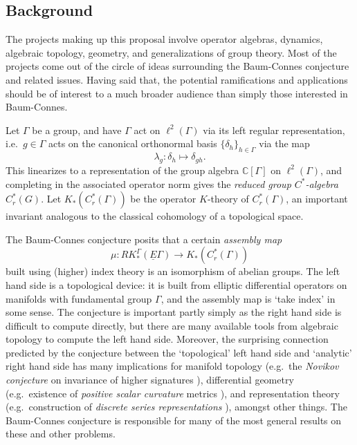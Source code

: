 \documentclass[11pt]{article}
\newcommand{\C}{\mathbb{C}}
\theoremstyle{plain}
\theoremstyle{definition}
\theoremstyle{remark}
\begin{document}
\subsection*{Background}

The projects making up this proposal involve operator algebras, dynamics, algebraic topology, geometry, and generalizations of group theory.  Most of the projects come out of the circle of ideas surrounding the Baum-Connes conjecture and related issues.  Having said that, the potential ramifications and applications should be of interest to a much broader audience than simply those interested in Baum-Connes.

Let $\Gamma$ be a group, and have $\Gamma$ act on $\ell^2(\Gamma)$ via its left regular representation, i.e.\ $g\in \Gamma$ acts on the canonical orthonormal basis $\{\delta_h\}_{h\in \Gamma}$ via the map 
$$
\lambda_g:\delta_h\mapsto \delta_{gh}.
$$
This linearizes to a representation of the group algebra $\C[\Gamma]$ on $\ell^2(\Gamma)$, and completing in the associated operator norm gives the \emph{reduced group $C^*$-algebra} $C^*_r(G)$.  Let $K_*(C^*_r(\Gamma))$ be the operator $K$-theory of $C^*_r(\Gamma)$, an important invariant analogous to the classical cohomology of a topological space.  

The Baum-Connes conjecture \cite{Baum:1994pr} posits that a certain \emph{assembly map}
\begin{equation}\label{bc ass}
\mu:RK_*^\Gamma(\underline{E}\Gamma)\to K_*(C^*_r(\Gamma))
\end{equation}
built using (higher) index theory is an isomorphism of abelian groups.  The left hand side is a topological device: it is built from elliptic differential operators on manifolds with fundamental group $\Gamma$, and the assembly map is `take index' in some sense.   The conjecture is important partly simply as the right hand side is difficult to compute directly, but there are many available tools from algebraic topology to compute the left hand side.  Moreover, the surprising connection predicted by the conjecture between the `topological' left hand side and `analytic' right hand side has many implications for manifold topology (e.g.\ the \emph{Novikov conjecture} on invariance of higher signatures \cite{Ferry:1993xw}), differential geometry (e.g.\ existence of \emph{positive scalar curvature} metrics \cite{Rosenberg:1983qy}), and representation theory (e.g.\ construction of \emph{discrete series representations} \cite{Lafforgue:2002zl}), amongst other things.  The Baum-Connes conjecture is responsible for many of the most general results on these and other problems.  
\end{document}
